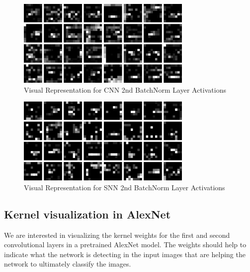 \documentclass[12pt, letterpaper]{article}
\begin{document}
\begin{figure}[H]
    \centering
    \includegraphics[width=0.75\textwidth]{conv2_cnn.png}
    \caption{Visual Representation for CNN 2nd BatchNorm Layer Activations}
    \label{fig:conv2_snn}
\end{figure}

\begin{figure}[H]
    \centering
    \includegraphics[width=0.75\textwidth]{conv2_snn.png}
    \caption{Visual Representation for SNN 2nd BatchNorm Layer Activations}
    \label{fig:snn_conv2}
\end{figure}

\subsection{Kernel visualization in AlexNet}
We are interested in visualizing the kernel weights for the first and second convolutional layers in a pretrained AlexNet model. The weights should help to indicate what the network is detecting in the input images that are helping the network to ultimately classify the images. 
\end{document}
